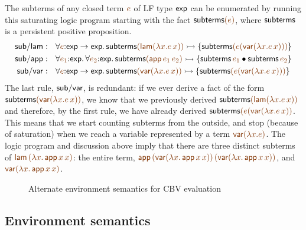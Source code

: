 The subterms of any closed term
$\lf{e}$ of LF type ${\sf exp}$ can be enumerated by running this
saturating logic program starting with the fact ${\sf subterms}\lf{(e)}$,
where ${\sf subterms}$ is a persistent positive proposition.
\begin{align*}
{\sf sub/lam} &: ~~
  \forall \lf{e}{:}{\sf exp} \rightarrow {\sf exp}.\,
    {\sf subterms}\lf{({\sf lam}(\lambda x.e\,x))} \lefti
      \{ {\sf subterms}\lf{(e({\sf var}(\lambda x.e\,x)))} \}
\\
{\sf sub/app} &: ~~
  \forall \lf{e_1}{:}{\sf exp}.\, \forall \lf{e_2}{:}{\sf exp}.\,
    {\sf subterms}\lf{({\sf app}\,e_1\,e_2)} \lefti
      \{ {\sf subterms}\,\lf{e_1} \fuse {\sf subterms}\,\lf{e_2} \}
\\
{\sf sub/var} &: ~~ 
  \forall \lf{e}{:}{\sf exp} \rightarrow {\sf exp}.\,
    {\sf subterms}\lf{({\sf var}(\lambda x.e\,x))} \lefti
      \{ {\sf subterms}\lf{(e({\sf var}(\lambda x.e\,x)))} \}
\end{align*}
The last rule, ${\sf sub/var}$, is redundant: if we ever derive a fact
of the form ${\sf subterms}\lf{({\sf var}(\lambda x.e\,x))}$, we know
that we previously derived ${\sf subterms}\lf{({\sf lam}(\lambda
  x.e\,x))}$ and therefore, by the first rule, we have already derived
${\sf subterms}\lf{(e({\sf var}(\lambda x.e\,x))}$.  This means that
we start counting subterms from the outside, and stop (because of
saturation) when we reach a variable represented by a term $\lf{{\sf
    var}(\lambda x.e)}$.  The logic program and discussion above imply
that there are three distinct subterms of $\lf{{\sf lam}\,(\lambda
  x.\,{\sf app}\,x\,x)}$: the entire term, $\lf{{\sf app}\,({\sf
    var}(\lambda x.\,{\sf app}\,x\,x))\,({\sf var}(\lambda x.\,{\sf
    app}\,x\,x))}$, and $\lf{{\sf var}(\lambda x.\,{\sf app}\,x\,x)}$.





\begin{figure}
\caption{Alternate environment semantics for CBV evaluation}
\label{fig:dest-env}
\end{figure}

\subsection{Environment semantics}


